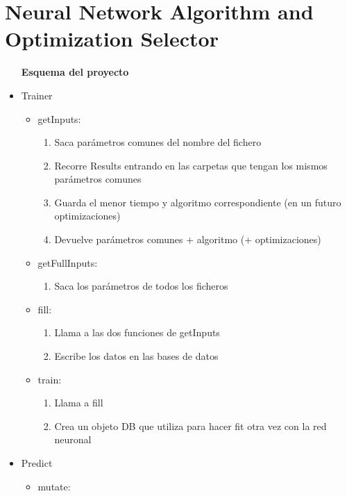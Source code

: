 \documentclass{article}
\begin{document}
\section{Neural Network Algorithm and Optimization Selector}

\begin{itemize}
    \item [\textbf{Esquema del proyecto}]
    \item Trainer
    \begin{itemize}
        \item getInputs:
        \begin {enumerate}
            \item Saca parámetros comunes del nombre del fichero
            \item Recorre Results entrando en las carpetas que tengan los mismos parámetros comunes
            \item Guarda el menor tiempo y algoritmo correspondiente (en un futuro optimizaciones)
            \item Devuelve parámetros comunes + algoritmo (+ optimizaciones)
        \end{enumerate}
        \item getFullInputs:
        \begin {enumerate}
            \item Saca los parámetros de todos los ficheros
        \end{enumerate}
        \item fill:
        \begin {enumerate}
            \item Llama a las dos funciones de getInputs
            \item Escribe los datos en las bases de datos
        \end{enumerate}
        \item train:
        \begin{enumerate}
            \item Llama a fill
            \item Crea un objeto DB que utiliza para hacer fit otra vez con la red neuronal
        \end{enumerate}
    \end{itemize}
    \item Predict
        \begin{itemize}
            \item mutate:
            \begin{enumerate}

\end{enumerate}
\end{itemize}
\end{itemize}
\end{document}
